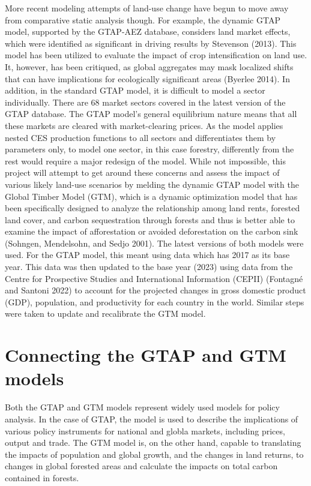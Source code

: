 \documentclass[
]{article}
\begin{document}
More recent modeling attempts of land-use change have begun to move away from comparative static analysis though. For example, the dynamic GTAP model, supported by the GTAP-AEZ database, considers land market effects, which were identified as significant in driving results by Stevenson (2013). This model has been utilized to evaluate the impact of crop intensification on land use. It, however, has been critiqued, as global aggregates may mask localized shifts that can have implications for ecologically significant areas (Byerlee 2014). In addition, in the standard GTAP model, it is difficult to model a sector individually. There are 68 market sectors covered in the latest version of the GTAP database. The GTAP model's general equilibrium nature means that all these markets are cleared with market-clearing prices. As the model applies nested CES production functions to all sectors and differentiates them by parameters only, to model one sector, in this case forestry, differently from the rest would require a major redesign of the model. While not impossible, this project will attempt to get around these concerns and assess the impact of various likely land-use scenarios by melding the dynamic GTAP model with the Global Timber Model (GTM), which is a dynamic optimization model that has been specifically designed to analyze the relationship among land rents, forested land cover, and carbon sequestration through forests and thus is better able to examine the impact of afforestation or avoided deforestation on the carbon sink (Sohngen, Mendelsohn, and Sedjo 2001). The latest versions of both models were used. For the GTAP model, this meant using data which has 2017 as its base year. This data was then updated to the base year (2023) using data from the Centre for Prospective Studies and International Information (CEPII) (Fontagné and Santoni 2022) to account for the projected changes in gross domestic product (GDP), population, and productivity for each country in the world. Similar steps were taken to update and recalibrate the GTM model.

\hypertarget{connecting-the-gtap-and-gtm-models}{%
\section{Connecting the GTAP and GTM models}\label{connecting-the-gtap-and-gtm-models}}

Both the GTAP and GTM models represent widely used models for policy analysis. In the case of GTAP, the model is used to describe the implications of various policy instruments for national and globla markets, including prices, output and trade. The GTM model is, on the other hand, capable to translating the impacts of population and global growth, and the changes in land returns, to changes in global forested areas and calculate the impacts on total carbon contained in forests.
\end{document}
